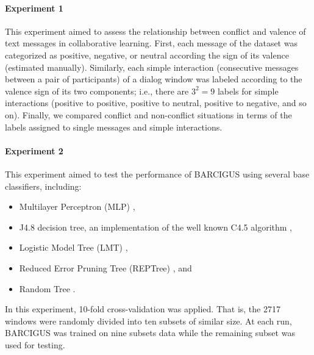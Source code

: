 \documentclass[3p,times,preprint]{elsarticle}
\begin{document}
\paragraph{\textbf{Experiment 1}} 
{\color{coolblack}
This experiment aimed to assess the relationship between conflict and valence of text messages in collaborative learning. First, each message of the dataset was categorized as positive, negative, or neutral according the sign of its valence (estimated manually). 
Similarly,  each simple interaction (consecutive messages between a pair of participants) of a dialog window was labeled according to the valence sign of its two components; i.e., there are $3^2=9$  labels for simple interactions (positive to positive, positive to neutral, positive to negative, and so on). Finally, we compared conflict and non-conflict situations in terms of the labels assigned to single messages and simple interactions.


\paragraph{\textbf{Experiment 2}} 
This  experiment aimed to test the performance of BARCIGUS using several base classifiers, including:
\begin{itemize}
  \setlength\itemsep{-0.5em}
    \item Multilayer Perceptron (MLP) \citep{GUPTA2000},
     \item J4.8 decision tree, an implementation of the well known C4.5 algorithm \citep{Hssina2014}, 
     \item  Logistic Model Tree (LMT) \citep{Landwehr2005}, 
     \item  Reduced Error Pruning Tree (REPTree) \citep{Mohamed2012}, and
     \item  Random Tree \citep{Breiman2001}.
    
\end{itemize}

In this experiment, 10-fold cross-validation was applied.  That is, the 2717 windows were  randomly
divided into ten subsets of similar size. At each run, BARCIGUS was trained on nine subsets data while the remaining subset was used for testing. }
\end{document}
